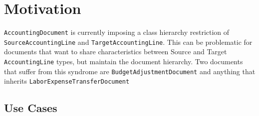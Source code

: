 \documentclass[12pt,notitlepage]{article}
\author{Leo Przybylski \\
\texttt{przybyls@u.arizona.edu}}
\begin{document}
  \maketitle
  \texonly{\tableofcontents \listoffigures} 
  \section{Motivation}
  \verb|AccountingDocument| is currently imposing a class hierarchy restriction of \verb|SourceAccountingLine|
  and \verb|TargetAccountingLine|. This can be problematic for documents that want to share characteristics 
  between Source and Target \verb|AccountingLine| types, but maintain the document hierarchy. Two documents
  that suffer from this syndrome are \verb|BudgetAdjustmentDocument| and anything that inherits \verb|LaborExpenseTransferDocument|
  
  \subsection{Use Cases}
\end{document}
